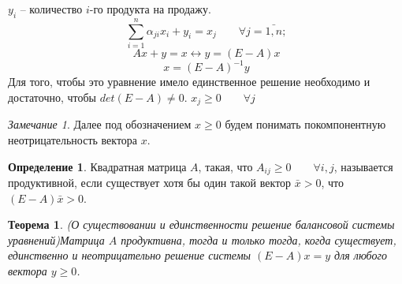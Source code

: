 \documentclass[12pt,a4paper,titlepage,oneside]{book}
\theoremstyle{definition}
\newtheorem{definition}{Определение}[chapter]
\theoremstyle{plain}
\newtheorem{theorem}{Теорема}[chapter]
\theoremstyle{remark}
\newtheorem{remark}{Замечание}[chapter]
\theoremstyle{remark}
\theoremstyle{plain}
\theoremstyle{plain}
\begin{document}
$y_i$ -- количество $i$-го продукта на продажу.
$$\sum \limits_{i = 1}^{n} \alpha_{ji}x_i + y_i = x_j \qquad \forall j = \bar{1,n};$$
$$Ax+y=x \leftrightarrow y=(E - A) x$$
$$x=(E-A)^{-1}y$$
Для того, чтобы это уравнение имело единственное решение необходимо и достаточно, чтобы  $det(E-A) \neq 0$.
$x_j \geq 0 \qquad \forall j$
\begin{remark}
Далее под обозначением $x \geq 0$ будем понимать покомпонентную неотрицательность вектора $x$.
\end{remark}
\begin{definition}
Квадратная матрица $A$, такая, что $A_{ij} \geq 0 \qquad \forall i,j$, называется продуктивной, если существует хотя бы один такой вектор $\bar{x} > 0$, что $(E-A)\bar{x} > 0$.
\end{definition}
\begin{theorem}(О существовании и единственности решение балансовой системы уравнений)\label{t1.1}
Матрица $A$ продуктивна, тогда и только тогда, когда существует, единственно и неотрицательно решение системы $(E-A)x=y$ для любого  вектора $y \geq 0$.
\end{theorem}
\end{document}
